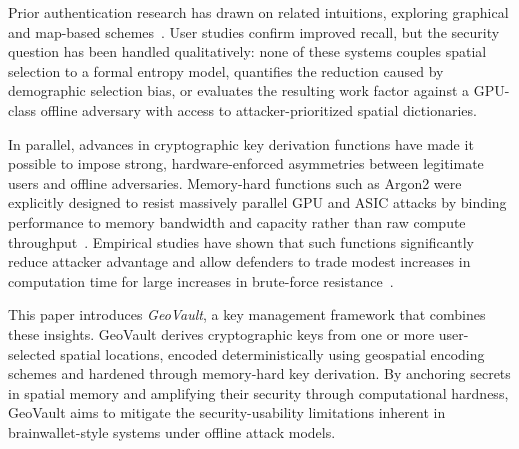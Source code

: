 \documentclass[journal,article,submit,pdftex,moreauthors]{Definitions/mdpi}
\newcommand{\add}[1]{#1}
\newcommand{\remove}[1]{}
\newcommand{\add}[1]{\added{#1}}
\newcommand{\remove}[1]{\deleted{#1}}
\begin{document}
\remove{These findings have motivated prior work exploring graphical and spatially inspired authentication mechanisms~\cite{Tari2006,Golla2017}. While such systems demonstrate improved memorability compared to textual passwords, they typically suffer from limited entropy, susceptibility to observation attacks, or strong user bias toward predictable choices. As a result, spatial memory has not yet been systematically integrated into cryptographic key derivation frameworks with explicit entropy modeling and hardware-aware offline threat assumptions.}\add{Prior authentication research has drawn on related intuitions, exploring graphical and map-based schemes~\cite{Tari2006,Golla2017,Sun2012,Thorpe2013}. User studies confirm improved recall, but the security question has been handled qualitatively: none of these systems couples spatial selection to a formal entropy model, quantifies the reduction caused by demographic selection bias, or evaluates the resulting work factor against a GPU-class offline adversary with access to attacker-prioritized spatial dictionaries.}

In parallel, advances in cryptographic key derivation functions have made it possible to impose strong, hardware-enforced asymmetries between legitimate users and offline adversaries. Memory-hard functions such as Argon2 were explicitly designed to resist massively parallel GPU and ASIC attacks by binding performance to memory bandwidth and capacity rather than raw compute throughput~\cite{7467361,Wetzels2016}. Empirical studies have shown that such functions significantly reduce attacker advantage and allow defenders to trade modest increases in computation time for large increases in brute-force resistance~\cite{Choe2019}.

This paper introduces \textit{GeoVault}, a key management framework that combines these insights. GeoVault derives cryptographic keys from one or more user-selected spatial locations, encoded deterministically using geospatial encoding schemes and hardened through memory-hard key derivation. By anchoring secrets in spatial memory and amplifying their security through computational hardness, GeoVault aims to mitigate the security-usability limitations inherent in brainwallet-style systems under offline attack models.
\end{document}

